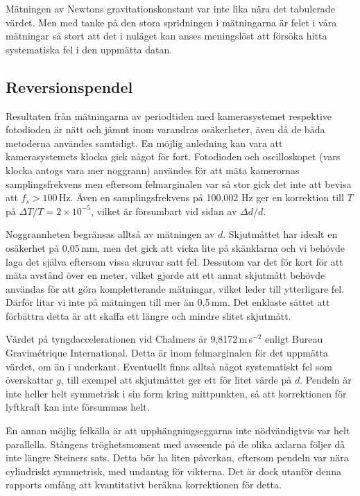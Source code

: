 \documentclass[11pt,a4paper]{article}
\begin{document}
Mätningen av Newtons gravitationskonstant var inte lika nära det tabulerade värdet. Men med tanke på den stora spridningen i mätningarna är felet i våra mätningar så stort att det i nuläget kan anses meningslöst att  försöka hitta systematiska fel i den uppmätta datan.

\subsection{Reversionspendel}
Resultaten från mätningarna av periodtiden med kamerasystemet respektive fotodioden är nätt och jämnt inom varandras osäkerheter, även då de båda metoderna användes samtidigt. En möjlig anledning kan vara att kamerasystemets klocka gick något för fort. Fotodioden och oscilloskopet (vars klocka antogs vara mer noggrann) användes för att mäta kamerornas samplingsfrekvens men eftersom felmarginalen var så stor gick det inte att bevisa att $f_s>100$\,Hz. Även en samplingsfrekvens på 100,002 Hz ger en korrektion till $T$ på $\Delta T/T = 2\times 10^{-5}$, vilket är försumbart vid sidan av $\Delta d/d$.

Noggrannheten begränsas alltså av mätningen av $d$. Skjutmåttet har idealt en osäkerhet på 0,05\,mm, men det gick att vicka lite på skänklarna och vi behövde laga det själva eftersom vissa skruvar satt fel. Dessutom var det för kort för att mäta avstånd över en meter, vilket gjorde att ett annat skjutmått behövde användas för att göra kompletterande mätningar, vilket leder till ytterligare fel. Därför litar vi inte på mätningen till mer än 0,5\,mm. Det enklaste sättet att förbättra detta är att skaffa ett längre och mindre slitet skjutmått. 

Värdet på tyngdaccelerationen vid Chalmers är 9,8172\,m\,s$^{-2}$ enligt Bureau Gravimétrique International\cite{BGI:reference}. Detta är inom felmarginalen för det uppmätta värdet, om än i underkant. Eventuellt finns alltså något systematiskt fel som överskattar $g$, till exempel att skjutmåttet ger ett för litet värde på $d$. Pendeln är inte heller helt symmetrisk i sin form kring mittpunkten, så att korrektionen för lyftkraft kan inte försummas helt.

En annan möjlig felkälla är att upphängningseggarna inte nödvändigtvis var helt parallella. Stångens tröghetsmoment med avseende på de olika axlarna följer då inte längre Steiners sats. Detta bör ha liten påverkan, eftersom pendeln var nära cylindriskt symmetrisk, med undantag för vikterna. Det är dock utanför denna rapports omfång att kvantitativt beräkna korrektionen för detta.
\end{document}
